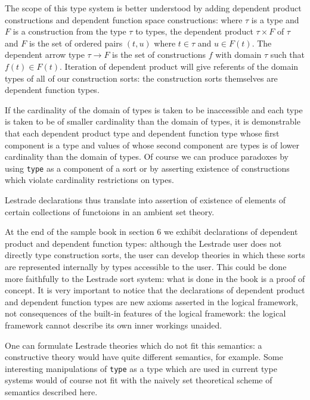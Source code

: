 \documentclass[12pt]{article}
\begin{document}
The scope of this type system is better understood by adding dependent product constructions and dependent function space constructions:  where $\tau$ is a type and
$F$ is a construction from the type $\tau$  to types, the dependent product $\tau \times F$ of $\tau$ and $F$ is the set of ordered pairs $(t,u)$ where $t \in \tau$ and $u \in F(t)$.   The dependent arrow type $\tau \rightarrow F$ is the set of constructions $f$ with domain $\tau$ such that $f(t) \in F(t)$.   Iteration of dependent product will give referents of the domain types of 
all of our construction sorts:  the construction sorts themselves are dependent function types.

If the cardinality of the domain of types is taken to be inaccessible and each type is taken to be of smaller cardinality than the domain of types,  it is demonstrable that each dependent product type and dependent function type
whose first component is a type and values of whose second component are types is of lower cardinality than the domain of types.    Of course we can produce paradoxes by using {\tt type} as a component of a sort or by asserting existence of constructions which violate cardinality restrictions on types.

Lestrade declarations thus translate into assertion of existence of elements of certain collections of functoions in an ambient set theory.

At the end of the sample book in section 6 we exhibit declarations of dependent product and dependent function types:   although the Lestrade user does not directly
type construction sorts, the user can develop theories in which these sorts are represented internally by types accessible to the user.  This could be done more faithfully to the
Lestrade sort system:  what is done in the book is a proof of concept.  It is very important to notice that the declarations of dependent product and dependent function types
are new axioms asserted in the logical framework, not consequences of the built-in features of the logical framework:  the logical framework cannot describe its own inner workings unaided.

One can formulate Lestrade theories which do not fit this semantics:  a constructive theory would have quite different semantics, for example.  Some interesting manipulations of
{\tt type} as a type which are used in current type systems would of course not fit with the naively set theoretical scheme of semantics described here.

\newpage
\end{document}

